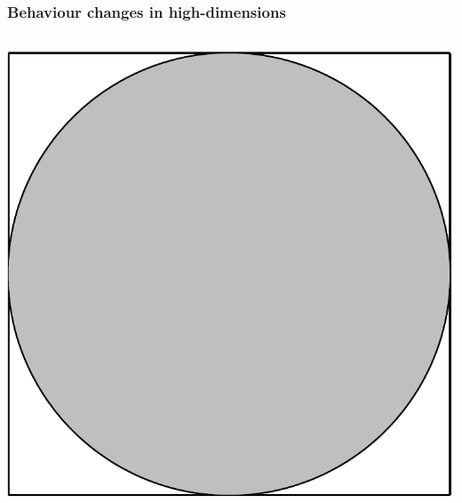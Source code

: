 \begin{frame}
\frametitle{Behaviour changes in high-dimensions}
\begin{columns}[c]
\includegraphics[width=.8\textwidth]{circle}


\end{columns}
\end{frame}
